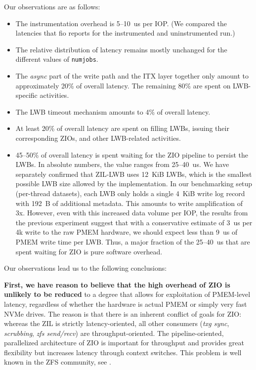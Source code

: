 \documentclass[12pt,a4paper,twoside]{book}
\begin{document}
{Our observations are as follows:
\begin{itemize}[noitemsep]
    \item The instrumentation overhead is 5--10~us per IOP. (We compared the latencies that fio reports for the instrumented and uninstrumented run.)
    \item The relative distribution of latency remains mostly unchanged for the different values of \lstinline{numjobs}.
    \item The \textit{async} part of the write path and the ITX layer together only amount to approximately 20\% of overall latency.
        The remaining 80\% are spent on LWB-specific activities.
    \item The LWB timeout mechanism amounts to 4\% of overall latency.
    \item At least 20\% of overall latency are spent on filling LWBs, issuing their corresponding ZIOs, and other LWB-related activities.
    \item 45--50\% of overall latency is spent waiting for the ZIO pipeline to persist the LWBs.
        In absolute numbers, the value ranges from 25--40~us.
        We have separately confirmed that ZIL-LWB uses 12~KiB LWBs, which is the smallest possible LWB size allowed by the implementation.
        In our benchmarking setup (per-thread datasets), each LWB only holds a single 4~KiB write log record with 192~B of additional metadata.
        This amounts to write amplification of 3x.
        However, even with this increased data volume per IOP, the results from the previous experiment suggest that with a conservative estimate of 3~us per 4k write to the raw PMEM hardware, we should expect less than 9~us of PMEM write time per LWB.
        Thus, a major fraction of the 25--40~us that are spent waiting for ZIO is pure software overhead.
\end{itemize}

Our observations lead us to the following conclusions:

\textbf{First, we have reason to believe that the high overhead of ZIO is unlikely to be reduced} to a degree that allows for exploitation of PMEM-level latency, regardless of whether the hardware is actual PMEM or simply very fast NVMe drives.
The reason is that there is an inherent conflict of goals for ZIO:
whereas the ZIL is strictly latency-oriented, all other consumers (\textit{txg sync}, \textit{scrubbing}, \textit{zfs send/recv}) are throughput-oriented.
The pipeline-oriented, parallelized architecture of ZIO is important for throughput and provides great flexibility but increases latency through context switches.
This problem is well known in the ZFS community, see \cite{openzfsZILPerformanceImprovements2020,ZFSSubredditRichardYaoCommentsOnPoorSynchronousWritePerformance,OpenZFSGithubIssueNVMeReadPerformanceZioPipeliningOverheadTimChaseComment}.

}
\end{document}
